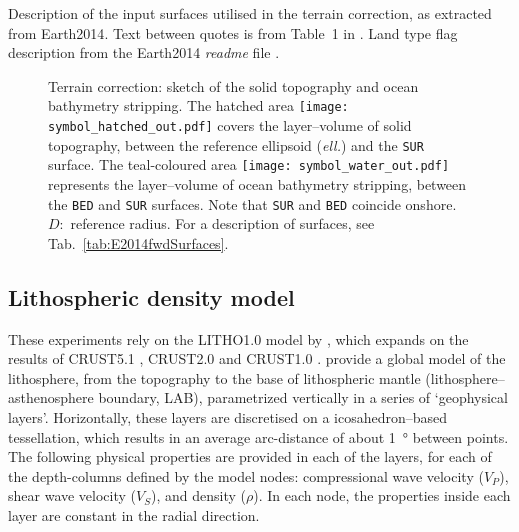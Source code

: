 \begin{table}[ht]
    \begin{adjustbox}{center}
        
    \end{adjustbox}
    \caption[Description of the input surfaces utilised in the terrain correction, as extracted from {Earth2014}.]{
        Description of the input surfaces utilised in the terrain correction, as extracted from {Earth2014}. Text between quotes is from Table~1 in \textcite{Hirt2015}. Land type flag description from the {Earth2014} \textit{readme} file \parencite{Hirt2015_Earth2014readme}.}
    \label{tab:E2014fwdSurfaces}
\end{table}

\begin{figure}
    \begin{adjustbox}{center}
    \end{adjustbox}
    \caption[Terrain correction: sketch of the solid topography and ocean bathymetry stripping.]{
        Terrain correction: sketch of the solid topography and ocean bathymetry stripping.
        The hatched area 
            \texttt{[image: symbol\_hatched\_out.pdf]}
        covers the layer--volume of solid topography, between the reference ellipsoid (\textit{ell.}) and the \texttt{SUR} surface.
        The teal-coloured area 
            \texttt{[image: symbol\_water\_out.pdf]}
        represents the layer--volume of ocean bathymetry stripping, between the \texttt{BED} and \texttt{SUR} surfaces. Note that \texttt{SUR} and \texttt{BED} coincide onshore.
        $D$:~reference radius.
        For a description of surfaces, see Tab.~\ref{tab:E2014fwdSurfaces}.
    }
    \label{fig:E2014fwdLayersSketch}
\end{figure}

\subsection{Lithospheric density model}
\label{ss:SigIs:InModels:CRUST}

These experiments rely on the {LITHO1.0} model by \textcite{Pasyanos2014}, which expands on the results of CRUST5.1 \parencite{Mooney1998_Crust51}, CRUST2.0 \parencite{Bassin2000Crust20} and CRUST1.0 \parencite{Laske2012Crust10}.
\Textcite{Pasyanos2014} provide a global model of the lithosphere, from the topography to the base of lithospheric mantle (lithosphere--asthenosphere boundary, LAB), parametrized vertically in a series of `geophysical layers'.
Horizontally, these layers are discretised on a icosahedron--based tessellation, which results in an average arc-distance of about \SI{1}{\degree} between points.
The following physical properties are provided in each of the layers, for each of the depth-columns defined by the model nodes: compressional wave velocity ($V_{P}$), shear wave velocity ($V_{S}$), and density ($\rho$).
In each node, the properties inside each layer are constant in the radial direction.

